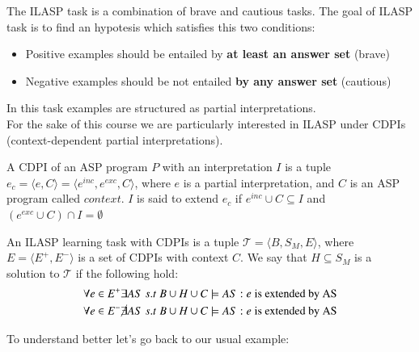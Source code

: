 The ILASP task is a combination of brave and cautious tasks. 
The goal of ILASP task is to find an hypotesis which satisfies this two conditions:
\begin{itemize}
    \item Positive examples should be entailed by \textbf{at least an answer set} (brave)
    \item Negative examples should be not entailed \textbf{by any answer set} (cautious)
\end{itemize}
In this task examples are structured as partial interpretations.\\

For the sake of this course we are particularly interested in ILASP under CDPIs (context-dependent partial interpretations).
\begin{tcolorbox}[colback=red!5!white,colframe=red!75!black,title=\textbf{Definition 3: Context-dependent partial interpretation (CDPI)}]
A CDPI of an ASP program $P$ with an interpretation $I$ is a tuple $e_c=\langle e, C\rangle = \langle e^{inc},e^{exc}, C\rangle$, where $e$ is a partial interpretation, and $C$ is an 
ASP program called $context$. $I$ is said to extend $e_c$ if $e^{inc}\cup C\subseteq I$ and $(e^{exc}\cup C) \cap I = \emptyset$
\end{tcolorbox}

\begin{tcolorbox}[colback=red!5!white,colframe=red!75!black,title=\textbf{Definition 4: ILASP task with CDPIs}]
An ILASP learning task with CDPIs is a tuple $\mathcal{T}=\langle B,S_M, E\rangle$, where $E=\langle E^+,E^- \rangle$ is a set of CDPIs
with context $C$. We say that $H\subseteq S_M$ is a solution to $\mathcal{T}$ if the following hold:
\begin{align*}
    \forall e \in E^+\exists AS\;s.t\; B\cup H\cup C\models AS: e \;\text{is extended by AS}\\
    \forall e \in E^-\cancel{\exists} AS\;s.t\; B\cup H\cup C\models AS: e \;\text{is extended by AS}
\end{align*}
\end{tcolorbox}

To understand better let's go back to our usual example:\\

